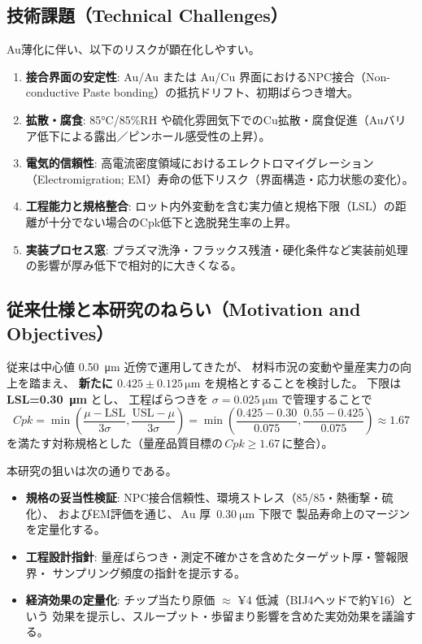 \documentclass[conference]{IEEEtran}
\begin{document}
\subsection*{技術課題（Technical Challenges）}
Au薄化に伴い、以下のリスクが顕在化しやすい。
\begin{enumerate}
  \item \textbf{接合界面の安定性}: Au/Au または Au/Cu 界面におけるNPC接合（Non-conductive Paste bonding）の抵抗ドリフト、初期ばらつき増大。
  \item \textbf{拡散・腐食}: 85\si{\celsius}/85\%RH や硫化雰囲気下でのCu拡散・腐食促進（Auバリア低下による露出／ピンホール感受性の上昇）。
  \item \textbf{電気的信頼性}: 高電流密度領域におけるエレクトロマイグレーション（Electromigration; EM）寿命の低下リスク（界面構造・応力状態の変化）。
  \item \textbf{工程能力と規格整合}: ロット内外変動を含む実力値と規格下限（LSL）の距離が十分でない場合のCpk低下と逸脱発生率の上昇。
  \item \textbf{実装プロセス窓}: プラズマ洗浄・フラックス残渣・硬化条件など実装前処理の影響が厚み低下で相対的に大きくなる。
\end{enumerate}

\subsection*{従来仕様と本研究のねらい（Motivation and Objectives）}
従来は中心値 \SI{0.50}{\micro\meter} 近傍で運用してきたが、
材料市況の変動や量産実力の向上を踏まえ、
\textbf{新たに $0.425 \pm 0.125\,\si{\micro\meter}$} を規格とすることを検討した。
下限は \textbf{LSL=\SI{0.30}{\micro\meter}} とし、
工程ばらつきを \(\sigma=\SI{0.025}{\micro\meter}\) で管理することで
\[
Cpk=\min\!\left(\frac{\mu-\mathrm{LSL}}{3\sigma},\frac{\mathrm{USL}-\mu}{3\sigma}\right)
=\min\!\left(\frac{0.425-0.30}{0.075},\frac{0.55-0.425}{0.075}\right)\approx1.67
\]
を満たす対称規格とした（量産品質目標の\(\,Cpk\ge1.67\,\)に整合）。

本研究の狙いは次の通りである。
\begin{itemize}
  \item \textbf{規格の妥当性検証}: NPC接合信頼性、環境ストレス（85/85・熱衝撃・硫化）、
        およびEM評価を通じ、\(\,\mathrm{Au}\) 厚 \(\,\SI{0.30}{\micro\meter}\) 下限で
        製品寿命上のマージンを定量化する。
  \item \textbf{工程設計指針}: 量産ばらつき・測定不確かさを含めたターゲット厚・警報限界・
        サンプリング頻度の指針を提示する。
  \item \textbf{経済効果の定量化}: チップ当たり原価 \(\approx\) ¥4 低減（BIJ4ヘッドで約¥16）という
        効果を提示し、スループット・歩留まり影響を含めた実効効果を議論する。
\end{itemize}
\end{document}
